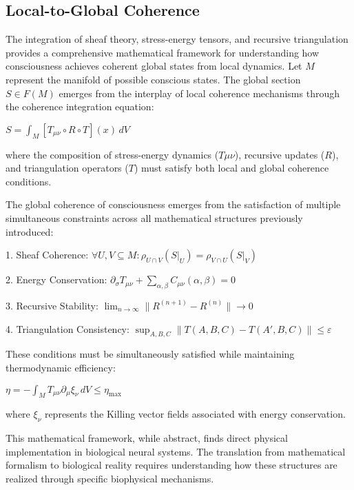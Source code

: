 \begin{refsection}
\section{Local-to-Global Coherence}

The integration of sheaf theory, stress-energy tensors, and recursive triangulation provides a comprehensive mathematical framework for understanding how consciousness achieves coherent global states from local dynamics. Let $M$ represent the manifold of possible conscious states. The global section $S \in F(M)$ emerges from the interplay of local coherence mechanisms through the coherence integration equation:

$S = \int_M [T_{\mu\nu} \circ R \circ T](x) \,dV$

where the composition of stress-energy dynamics ($T\mu\nu$), recursive updates ($R$), and triangulation operators ($T$) must satisfy both local and global coherence conditions.

The global coherence of consciousness emerges from the satisfaction of multiple simultaneous constraints across all mathematical structures previously introduced:

1. Sheaf Coherence:
$\forall U,V \subseteq M: \rho_{U \cap V}(S|_U) = \rho_{V \cap U}(S|_V)$

2. Energy Conservation:
$\partial_\sigma T_{\mu\nu} + \sum_{\alpha,\beta} C_{\mu\nu}(\alpha,\beta) = 0$

3. Recursive Stability:
$\lim_{n \rightarrow \infty} \|R^{(n+1)} - R^{(n)}\| \rightarrow 0$

4. Triangulation Consistency:
$\sup_{A,B,C} \|T(A,B,C) - T(A',B,C)\| \leq \varepsilon$

These conditions must be simultaneously satisfied while maintaining thermodynamic efficiency:

$\eta = -\int_M T_{\mu\nu}\partial_\mu\xi_\nu \,dV \leq \eta_{\text{max}}$

where $\xi_\nu$ represents the Killing vector fields associated with energy conservation.

This mathematical framework, while abstract, finds direct physical implementation in biological neural systems. The translation from mathematical formalism to biological reality requires understanding how these structures are realized through specific biophysical mechanisms.


\end{refsection}

